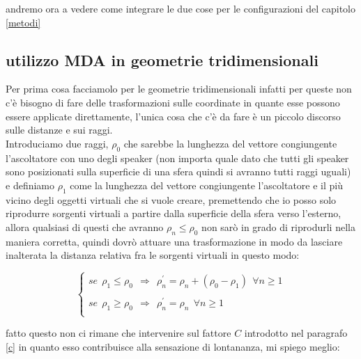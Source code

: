 \documentclass[12pt,a4paper]{report}
\begin{document}
andremo ora a vedere come integrare le due cose per le configurazioni del capitolo \ref{metodi}

\subsection{utilizzo MDA in geometrie tridimensionali}

Per prima cosa facciamolo per le geometrie tridimensionali infatti per queste non c'è bisogno di fare delle trasformazioni sulle coordinate in quante esse possono essere applicate direttamente, l'unica cosa che c'è da fare è un piccolo discorso sulle distanze e sui raggi.\\

Introduciamo due raggi, $\rho_0$ che sarebbe la lunghezza del vettore congiungente l'ascoltatore con uno degli speaker (non importa quale dato che tutti gli speaker sono posizionati sulla superficie di una sfera quindi si avranno tutti raggi uguali) e definiamo $\rho_1$ come la lunghezza del vettore congiungente l'ascoltatore e il più vicino degli oggetti virtuali che si vuole creare, premettendo che io posso solo riprodurre sorgenti virtuali a partire dalla superficie della sfera verso l'esterno, allora qualsiasi di questi che avranno $\rho_n \leq \rho_0$ non sarò in grado di riprodurli nella maniera corretta, quindi dovrò attuare una trasformazione in modo da lasciare inalterata la distanza relativa fra le sorgenti virtuali in questo modo:

\begin{equation}
\left\{\begin{matrix}
se\ \  \rho_1 \leq \rho_0\ \ \Rightarrow \ \ \rho_n^{\prime} = \rho_n+(\rho_0 - \rho_1) \ \ \forall n \geq 1\\
\\
se\ \  \rho_1 \geq \rho_0\ \ \Rightarrow \ \ \rho_n^{\prime} = \rho_n\ \ \forall n \geq 1\\
\end{matrix}\right.
\label{jjjj}
\end{equation}

fatto questo non ci rimane che intervenire sul fattore $C$ introdotto nel paragrafo \ref{c} in quanto esso contribuisce alla sensazione di lontananza, mi spiego meglio:
\end{document}
